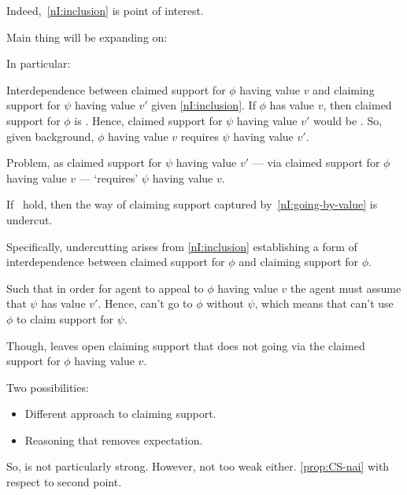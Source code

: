 \begin{note}
  Indeed,~\ref{nI:inclusion} is point of interest.



  Main thing will be expanding on:

  \begin{quote}
    \vspace{-\baselineskip}
    \ideaEIS*
  \end{quote}

  In particular:

  \begin{quote}
    \vspace{-\baselineskip}
    \assuEIS*
  \end{quote}

  Interdependence between claimed support for \(\phi\) having value \(v\) and claiming support for \(\psi\) having value \(v'\) given \ref{nI:inclusion}.
  If \(\phi\) has value \(v\), then claimed support for \(\phi\) is \nmom{}.
  Hence, claimed support for \(\psi\) having value \(v'\) would be \nmom{}.
  So, given background, \(\phi\) having value \(v\) requires \(\psi\) having value \(v'\).

  Problem, as claimed support for \(\psi\) having value \(v'\) --- via claimed support for \(\phi\) having value \(v\) --- `requires' \(\psi\) having value \(v\).

  {\color{green}
    If~\nIBackground{} hold, then the way of claiming support captured by~\ref{nI:going-by-value} is undercut.

    Specifically, undercutting arises from \ref{nI:inclusion} establishing a form of interdependence between claimed support for \(\phi\) and claiming support for \(\phi\).

    Such that in order for agent to appeal to \(\phi\) having value \(v\) the agent must assume that \(\psi\) has value \(v'\).
    Hence, can't go to \(\phi\) without \(\psi\), which means that can't use \(\phi\) to claim support for \(\psi\).
  }

  Though, leaves open claiming support that does not going via the claimed support for \(\phi\) having value \(v\).

  Two possibilities:
  \begin{itemize}
  \item Different approach to claiming support.
  \item Reasoning that removes expectation.
  \end{itemize}

  So, \nI{} is not particularly strong.
  However, not too weak either.
  \autoref{prop:CS-nai} with respect to second point.
\end{note}

